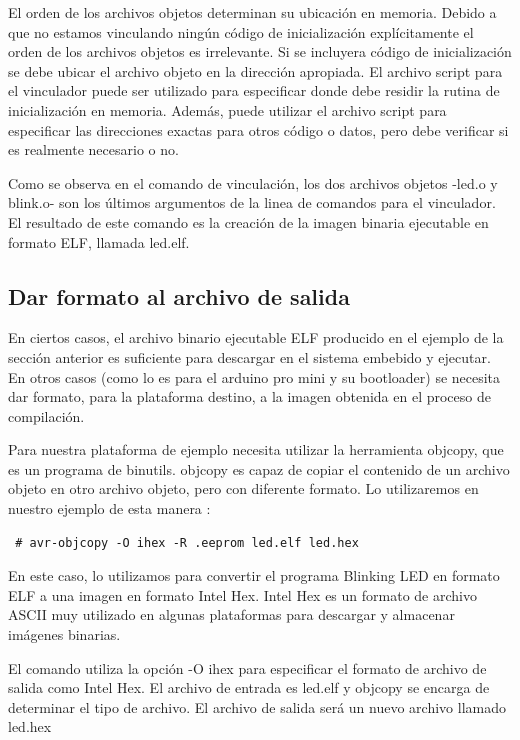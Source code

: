 \documentclass[12pt]{article}
\begin{document}
El orden de los archivos objetos determinan su ubicación en memoria.
Debido a que no estamos vinculando ningún código de inicialización explícitamente
el orden de los archivos objetos es irrelevante.
Si se incluyera código de inicialización se debe ubicar el archivo objeto 
en la dirección apropiada. El archivo script para el vinculador puede ser 
utilizado para especificar donde debe residir la rutina de inicialización
en memoria. Además, puede utilizar el archivo script para 
especificar las direcciones exactas para otros código o datos, pero debe
verificar si es realmente necesario o no.

Como se observa en el comando de vinculación, los dos archivos objetos -led.o y blink.o-
son los últimos argumentos de la linea de comandos para el vinculador.
El resultado de este comando es la creación de la imagen binaria ejecutable
en formato ELF, llamada led.elf.

\subsection *{Dar formato al archivo de salida}

En ciertos casos, el archivo binario ejecutable ELF producido en el 
ejemplo de la sección anterior es suficiente para descargar en el sistema 
embebido y ejecutar. En otros casos (como lo es para el arduino pro mini
y su bootloader) se necesita dar formato, para la plataforma destino,
 a la imagen obtenida
en el proceso de compilación.

Para nuestra plataforma de ejemplo necesita utilizar la herramienta
objcopy, que es un programa de binutils.
objcopy es capaz de copiar el contenido de un archivo objeto en otro 
archivo objeto, pero con diferente formato.
Lo utilizaremos en nuestro ejemplo de esta manera :

\begin{verbatim}
 # avr-objcopy -O ihex -R .eeprom led.elf led.hex
\end{verbatim}

En este caso, lo utilizamos para convertir el programa Blinking LED 
en formato ELF a una imagen en formato Intel Hex. Intel Hex 
es un formato de archivo ASCII muy utilizado en algunas plataformas
para descargar y almacenar imágenes binarias.

El comando utiliza la opción -O ihex para especificar el formato 
de archivo de salida como Intel Hex. El archivo de entrada es led.elf
y objcopy se encarga de determinar el tipo de archivo. El archivo de salida
será un nuevo archivo llamado led.hex
\end{document}
